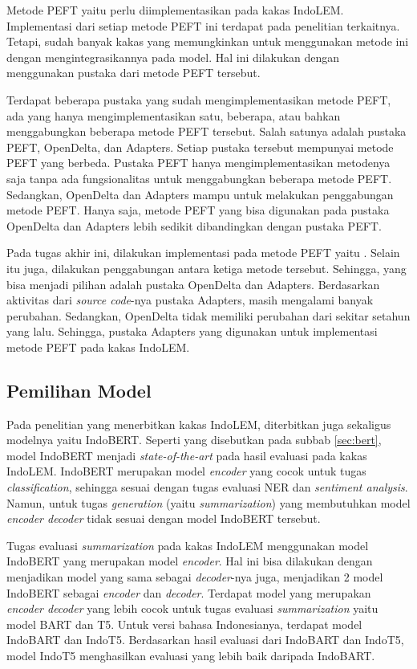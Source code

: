Metode PEFT yaitu \methodPEFT perlu diimplementasikan pada kakas IndoLEM. Implementasi dari setiap metode PEFT ini terdapat pada penelitian terkaitnya. Tetapi, sudah banyak kakas yang memungkinkan untuk menggunakan metode ini dengan mengintegrasikannya pada model. Hal ini dilakukan dengan menggunakan pustaka dari metode PEFT tersebut.

Terdapat beberapa pustaka yang sudah mengimplementasikan metode PEFT, ada yang hanya mengimplementasikan satu, beberapa, atau bahkan menggabungkan beberapa metode PEFT tersebut. Salah satunya adalah pustaka PEFT, OpenDelta, dan Adapters. Setiap pustaka tersebut mempunyai metode PEFT yang berbeda. Pustaka PEFT hanya mengimplementasikan metodenya saja tanpa ada fungsionalitas untuk menggabungkan beberapa metode PEFT. Sedangkan, OpenDelta dan Adapters mampu untuk melakukan penggabungan metode PEFT. Hanya saja, metode PEFT yang bisa digunakan pada pustaka OpenDelta dan Adapters lebih sedikit dibandingkan dengan pustaka PEFT.

Pada tugas akhir ini,  dilakukan implementasi pada metode PEFT yaitu \methodPEFT. Selain itu juga, dilakukan penggabungan antara ketiga metode tersebut. Sehingga, yang bisa menjadi pilihan adalah pustaka OpenDelta dan Adapters. Berdasarkan aktivitas dari \textit{source code}-nya pustaka Adapters, masih mengalami banyak perubahan. Sedangkan, OpenDelta tidak memiliki perubahan dari sekitar setahun yang lalu. Sehingga, pustaka Adapters yang  digunakan untuk implementasi metode PEFT pada kakas IndoLEM.

\subsection{Pemilihan Model}

Pada penelitian yang menerbitkan kakas IndoLEM, diterbitkan juga sekaligus modelnya yaitu IndoBERT. Seperti yang disebutkan pada subbab \ref{sec:bert}, model IndoBERT menjadi \textit{state-of-the-art} pada hasil evaluasi pada kakas IndoLEM. IndoBERT merupakan model \textit{encoder} yang cocok untuk tugas \textit{classification}, sehingga sesuai dengan tugas evaluasi NER dan \textit{sentiment analysis}. Namun, untuk tugas \textit{generation} (yaitu \textit{summarization}) yang membutuhkan model \textit{encoder decoder} tidak sesuai dengan model IndoBERT tersebut.

Tugas evaluasi \textit{summarization} pada kakas IndoLEM menggunakan model IndoBERT yang merupakan model \textit{encoder}. Hal ini bisa dilakukan dengan menjadikan model yang sama sebagai \textit{decoder}-nya juga, menjadikan 2 model IndoBERT sebagai \textit{encoder} dan \textit{decoder}. Terdapat model yang merupakan \textit{encoder decoder} yang lebih cocok untuk tugas evaluasi \textit{summarization} yaitu model BART dan T5. Untuk versi bahasa Indonesianya, terdapat model IndoBART dan IndoT5. Berdasarkan hasil evaluasi dari IndoBART dan IndoT5, model IndoT5 menghasilkan evaluasi yang lebih baik daripada IndoBART. 

